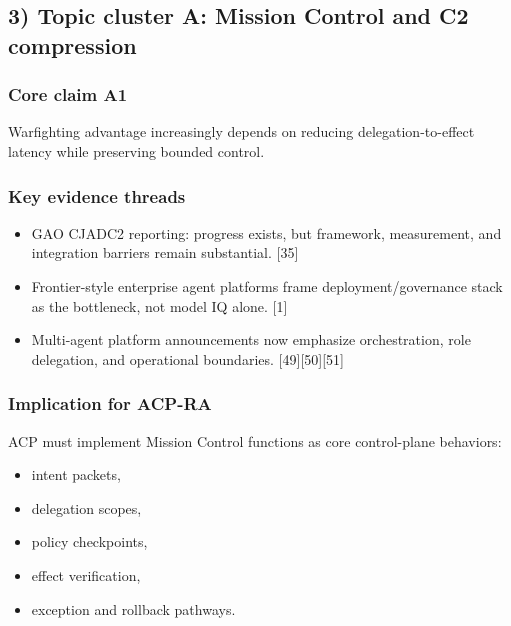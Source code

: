 \documentclass[11pt]{article}
\begin{document}
\hypertarget{topic-cluster-a-mission-control-and-c2-compression}{%
\subsection{3) Topic cluster A: Mission Control and C2
compression}\label{topic-cluster-a-mission-control-and-c2-compression}}

\hypertarget{core-claim-a1}{%
\subsubsection{Core claim A1}\label{core-claim-a1}}

Warfighting advantage increasingly depends on reducing
delegation-to-effect latency while preserving bounded control.

\hypertarget{key-evidence-threads}{%
\subsubsection{Key evidence threads}\label{key-evidence-threads}}

\begin{itemize}
\tightlist
\item
  GAO CJADC2 reporting: progress exists, but framework, measurement, and
  integration barriers remain substantial. {[}35{]}
\item
  Frontier-style enterprise agent platforms frame deployment/governance
  stack as the bottleneck, not model IQ alone. {[}1{]}
\item
  Multi-agent platform announcements now emphasize orchestration, role
  delegation, and operational boundaries. {[}49{]}{[}50{]}{[}51{]}
\end{itemize}

\hypertarget{implication-for-acp-ra}{%
\subsubsection{Implication for ACP-RA}\label{implication-for-acp-ra}}

ACP must implement Mission Control functions as core control-plane
behaviors:

\begin{itemize}
\tightlist
\item
  intent packets,
\item
  delegation scopes,
\item
  policy checkpoints,
\item
  effect verification,
\item
  exception and rollback pathways.
\end{itemize}
\end{document}
